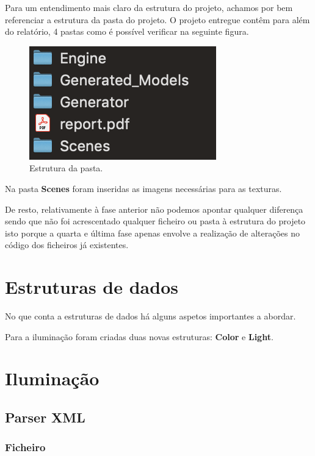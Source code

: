 \documentclass[a4paper]{article}
\begin{document}
Para um entendimento mais claro da estrutura do projeto, achamos por bem referenciar a estrutura da pasta do projeto.
O projeto entregue contêm para além do relatório, 4 pastas como é possível verificar na seguinte figura.

\begin{figure}[H]
\centering
\includegraphics[scale=1.0]{estrutura.png}
\caption{Estrutura da pasta.}
\label{img:estrutura}
\end{figure}

Na pasta \textbf{Scenes} foram inseridas as imagens necessárias para as texturas.

De resto, relativamente à fase anterior não podemos apontar qualquer diferença sendo que não foi acrescentado qualquer ficheiro ou pasta à estrutura do projeto isto porque a quarta e última fase apenas envolve a realização de alterações no código dos ficheiros já existentes.

\newpage

\section{Estruturas de dados}
\label{sec:estruturadados}

No que conta a estruturas de dados há alguns aspetos importantes a abordar.

Para a iluminação foram criadas duas novas estruturas: \textbf{Color} e \textbf{Light}.



\section{Iluminação}
\label{sec:iluminacao}

\subsection{Parser XML}
\label{sec:parseri}

\subsubsection{Ficheiro}
\label{sec:ficheiroi}
\end{document}
